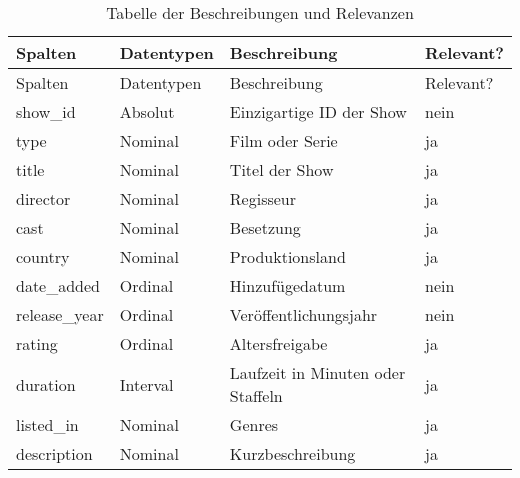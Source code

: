 \documentclass[
]{article}
\begin{document}
\begin{longtable}[]{@{}
  >{\raggedleft\arraybackslash}p{}
  >{\centering\arraybackslash}p{}
  >{\raggedright\arraybackslash}p{}
  >{\centering\arraybackslash}p{}@{}}
\caption{Tabelle der Beschreibungen und Relevanzen}\tabularnewline
\toprule\noalign{}
\begin{minipage}[b]{\linewidth}\raggedleft
Spalten
\end{minipage} & \begin{minipage}[b]{\linewidth}\centering
Datentypen
\end{minipage} & \begin{minipage}[b]{\linewidth}\raggedright
Beschreibung
\end{minipage} & \begin{minipage}[b]{\linewidth}\centering
Relevant?
\end{minipage} \\
\midrule\noalign{}
\endfirsthead
\toprule\noalign{}
\begin{minipage}[b]{\linewidth}\raggedleft
Spalten
\end{minipage} & \begin{minipage}[b]{\linewidth}\centering
Datentypen
\end{minipage} & \begin{minipage}[b]{\linewidth}\raggedright
Beschreibung
\end{minipage} & \begin{minipage}[b]{\linewidth}\centering
Relevant?
\end{minipage} \\
\midrule\noalign{}
\endhead
\bottomrule\noalign{}
\endlastfoot
show\_id & Absolut & Einzigartige ID der Show & nein \\
type & Nominal & Film oder Serie & ja \\
title & Nominal & Titel der Show & ja \\
director & Nominal & Regisseur & ja \\
cast & Nominal & Besetzung & ja \\
country & Nominal & Produktionsland & ja \\
date\_added & Ordinal & Hinzufügedatum & nein \\
release\_year & Ordinal & Veröffentlichungsjahr & nein \\
rating & Ordinal & Altersfreigabe & ja \\
duration & Interval & Laufzeit in Minuten oder Staffeln & ja \\
listed\_in & Nominal & Genres & ja \\
description & Nominal & Kurzbeschreibung & ja \\
\end{longtable}
\end{document}
